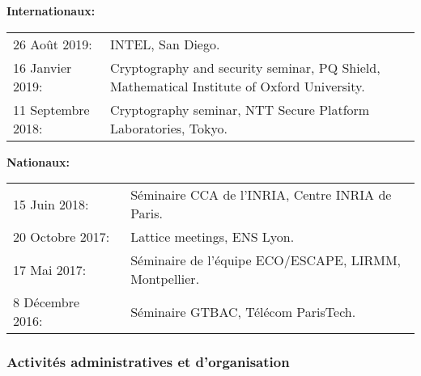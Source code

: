 \documentclass[11pt]{article}
\begin{document}
\noindent\textbf{Internationaux:}\\

\hspace{-0.85cm}
\begin{tabular}{ll}
  
  26 Août 2019: &  %
      INTEL, San Diego.\\[5pt]
  
  16 Janvier 2019: & %
  Cryptography and security seminar, PQ Shield, Mathematical Institute of Oxford University.\\[5pt]
  
  11 Septembre 2018: &  %
                    Cryptography seminar, NTT Secure Platform Laboratories, Tokyo.
\end{tabular}

\bigskip
\noindent\textbf{Nationaux:}\\

\hspace{-0.85cm}\begin{tabular}{ll}
  15 Juin 2018: & %
                  Séminaire CCA de l'INRIA, Centre INRIA de Paris.\\[5pt]
  20 Octobre 2017: &  %
                  Lattice meetings, ENS Lyon.\\[5pt]
  17 Mai 2017: &  %
                  Séminaire de l'équipe ECO/ESCAPE, LIRMM, Montpellier.\\[5pt]
  8 Décembre 2016:~~~\, &  %
                  Séminaire GTBAC, Télécom ParisTech.
\end{tabular}

\subsubsection*{Activités administratives et d'organisation}
\end{document}
